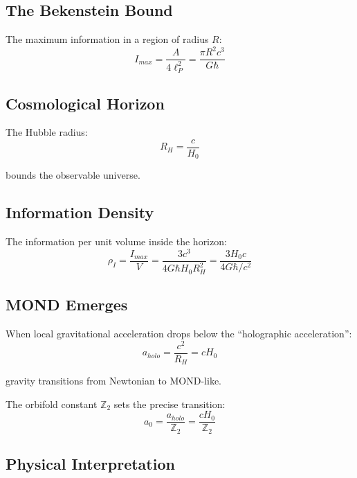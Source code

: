 \documentclass[12pt,a4paper]{article}
\begin{document}
\subsection{The Bekenstein Bound}

The maximum information in a region of radius $R$:
\begin{equation}
I_{max} = \frac{A}{4\ell_P^2} = \frac{\pi R^2 c^3}{G\hbar}
\end{equation}

\subsection{Cosmological Horizon}

The Hubble radius:
\begin{equation}
R_H = \frac{c}{H_0}
\end{equation}

bounds the observable universe.

\subsection{Information Density}

The information per unit volume inside the horizon:
\begin{equation}
\rho_I = \frac{I_{max}}{V} = \frac{3c^3}{4G\hbar H_0 R_H^2} = \frac{3H_0 c}{4G\hbar/c^2}
\end{equation}

\subsection{MOND Emerges}

When local gravitational acceleration drops below the ``holographic acceleration'':
\begin{equation}
a_{holo} = \frac{c^2}{R_H} = cH_0
\end{equation}

gravity transitions from Newtonian to MOND-like.

The orbifold constant $\mathbb{Z}_2$ sets the precise transition:
\begin{equation}
a_0 = \frac{a_{holo}}{\mathbb{Z}_2} = \frac{cH_0}{\mathbb{Z}_2}
\end{equation}

\subsection{Physical Interpretation}
\end{document}

